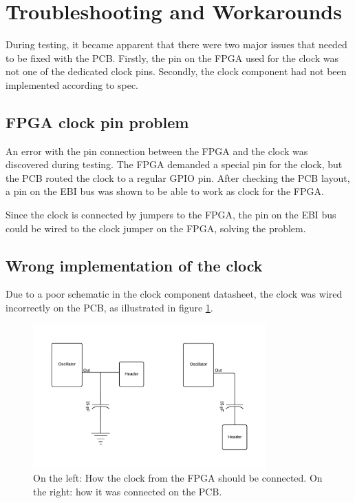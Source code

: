 \documentclass[../main/report.tex]{subfiles}
\begin{document}
\section{Troubleshooting and Workarounds}

During testing, it became apparent that there were two major issues that needed to be fixed with the PCB.
Firstly, the pin on the FPGA used for the clock was not one of the dedicated clock pins.
Secondly, the clock component had not been implemented according to spec.

\subsection*{FPGA clock pin problem}
An error with the pin connection between the FPGA and the clock was discovered during testing.
The FPGA demanded a special pin for the clock, but the PCB routed the clock to a regular GPIO pin.
After checking the PCB layout, a pin on the EBI bus was shown to be able to work as clock for the FPGA.

Since the clock is connected by jumpers to the FPGA, the pin on the EBI bus could be wired to the clock jumper on the FPGA, solving the problem.

\subsection*{Wrong implementation of the clock}

Due to a poor schematic in the clock component datasheet, the clock was wired incorrectly on the PCB, as illustrated in figure \ref{fig:pcb-clock}.

\begin{figure}[H]
    \centering
    \includegraphics[width=0.8\textwidth]{../pcb/assets/pcb-clock.pdf}
    \caption{On the left: How the clock from the FPGA should be connected.
             On the right: how it was connected on the PCB.}
    \label{fig:pcb-clock}
\end{figure}
\end{document}
